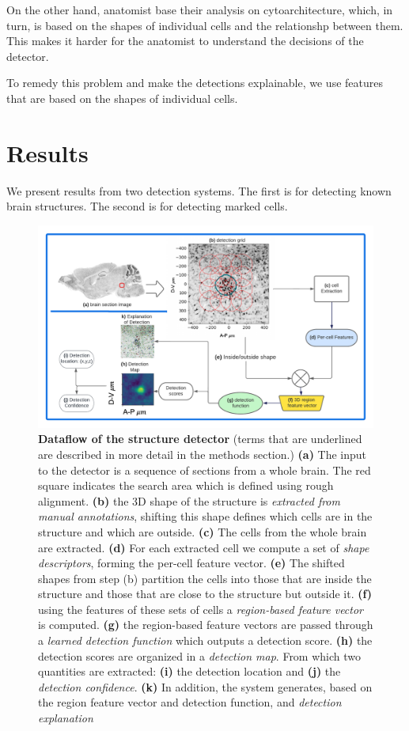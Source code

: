 \documentclass[11pt]{article}
\begin{document}
On the other hand, anatomist base their analysis on cytoarchitecture,
which, in turn, is based on the shapes of individual cells and the
relationshp between them. This makes it harder for the anatomist to
understand the decisions of the detector.

To remedy this problem and make the detections explainable, we use
features that are based on the shapes of individual cells.

\section{Results}

We present results from two detection systems. The first is for detecting known
brain structures. The second is for detecting marked cells. 

\begin{figure}[t]
  \includegraphics[width=\textwidth]{figures/detection.pdf}
  \caption{\label{fig:detector} {\bf Dataflow of the structure
      detector} (terms that are underlined are described in more
    detail in the methods section.) {\bf (a)} The input to the detector
    is a sequence of sections from a whole brain. The red square
    indicates the search area which is defined using rough
    alignment. {\bf (b)} the 3D shape of the structure is {\em
      extracted from manual annotations},
    shifting this shape defines which cells are in the structure and
    which are outside. {\bf (c)} The cells from the whole brain are
    extracted. {\bf (d)} For each extracted cell we compute a set of
    {\em shape descriptors}, forming the per-cell feature vector. {\bf (e)}
    The shifted shapes from step (b) partition the cells into those
    that are inside the structure and those that are close to the
    structure but outside it. {\bf (f)} using the features of these
    sets of cells a {\em region-based feature vector} is
    computed. {\bf (g)} the region-based feature vectors are passed
    through a {\em learned detection function} which outputs a
    detection score. {\bf (h)} the detection scores are organized in
    a {\em detection map}. From which two quantities are extracted:
    {\bf (i)} the detection location and {\bf (j)} the {\em detection
      confidence}. {\bf (k)} In addition, the system generates, based on the
    region feature vector and detection function, and {\em detection
      explanation}}
\end{figure}
\end{document}
